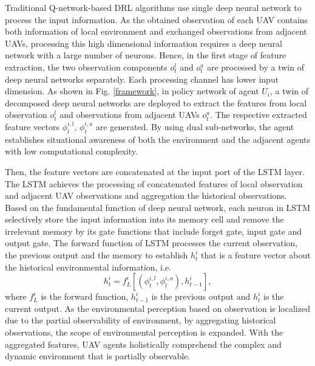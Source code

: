 \documentclass[journal]{IEEEtran}
\begin{document}
Traditional Q-network-based DRL algorithms use single deep neural network to process the input information. As the obtained observation of each UAV contains both information of local environment and exchanged observations from adjacent UAVs, processing this high dimensional information requires a deep neural network with a large number of neurons. Hence, in the first stage of feature extraction, the two observation components $o^l_t$ and $o^a_t$ are processed by a twin of deep neural networks separately. Each processing channel has lower input dimension. As shown in Fig. \ref{framework}, in policy network of agent $U_i$, a twin of decomposed deep neural networks are deployed to extract the features from local observation $o^l_t$ and observations from adjacent UAVs $o^a_t$. The respective extracted feature vectors $\phi^{i,l}_t$, $\phi^{i,a}_t$ are generated. By using dual sub-networks, the agent establishes situational awareness of both the environment and the adjacent agents with low computational complexity. 

Then, the feature vectors are concatenated at the input port of the LSTM layer. 
The LSTM achieves the processing of concatenated features of local observation and adjacent UAV observations and aggregation the historical observations. Based on the fundamental function of deep neural network, each neuron in LSTM selectively store the input information into its memory cell and remove the irrelevant memory by its gate functions that include forget gate, input gate and output gate. The forward function of LSTM processes the current observation, the previous output and the memory to establish $h^i_{t}$ that is a feature vector about the historical environmental information, i.e. 
\begin{equation}\label{lstm_fwd}
  h^i_t=f^i_L\left[{\left({\phi^{i,l}_t, \phi^{i,a}_t}\right), h^i_{t-1}}\right],
\end{equation}
where $f^i_L$ is the forward function, $h^i_{t-1}$ is the previous output and $h^i_t$ is the current output. As the environmental perception based on observation is localized due to the partial observability of environment, by aggregating historical observations, the scope of environmental perception is expanded. With the aggregated features, UAV agents holistically comprehend the complex and dynamic environment that is partially observable.
\end{document}
